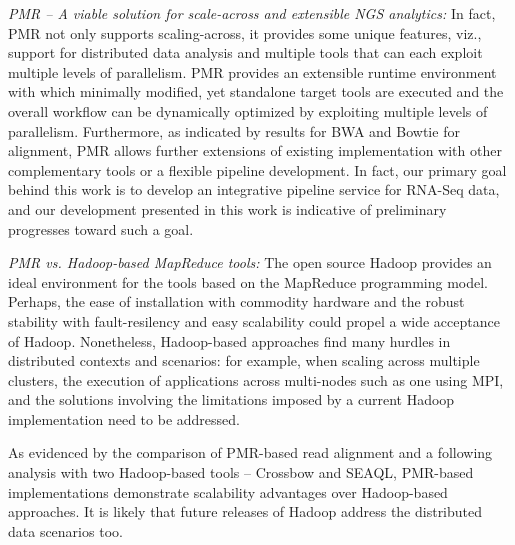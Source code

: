 \documentclass{acm_proc_article-sp}
\begin{document}

\textit{PMR -- A viable solution for scale-across and extensible NGS
  analytics:} In fact, PMR not only supports scaling-across, it
provides some unique features, viz., support for distributed data
analysis and multiple tools that can each exploit multiple levels of
parallelism. %
PMR provides an extensible runtime environment with which minimally
modified, yet standalone target tools are executed and the overall
workflow can be dynamically optimized by exploiting multiple levels of
parallelism. Furthermore, as indicated by results for BWA and Bowtie
for alignment, PMR allows further extensions of existing
implementation with other complementary tools or a flexible pipeline
development.  In fact, our primary goal behind this work is to develop
an integrative pipeline service for RNA-Seq data, and our development
presented in this work is indicative of preliminary progresses toward
such a goal.

\textit{PMR vs. Hadoop-based MapReduce tools: }The open source Hadoop
provides an ideal environment for the tools based on the MapReduce
programming model.  Perhaps, the ease of installation with commodity
hardware and the robust stability with fault-resilency and easy
scalability could propel a wide acceptance of Hadoop.  Nonetheless,
Hadoop-based approaches find many hurdles in distributed contexts and
scenarios: for example, when scaling across multiple
clusters\cite{weissman-mr-11}, the execution of applications across
multi-nodes such as one using MPI, and the solutions involving the
limitations imposed by a current Hadoop implementation need to be
addressed.


As evidenced by the comparison of PMR-based read alignment and a
following analysis with two Hadoop-based tools -- Crossbow and SEAQL,
PMR-based implementations demonstrate scalability advantages over
Hadoop-based approaches. It is likely that future releases of Hadoop
address the distributed data scenarios too.
\end{document}

